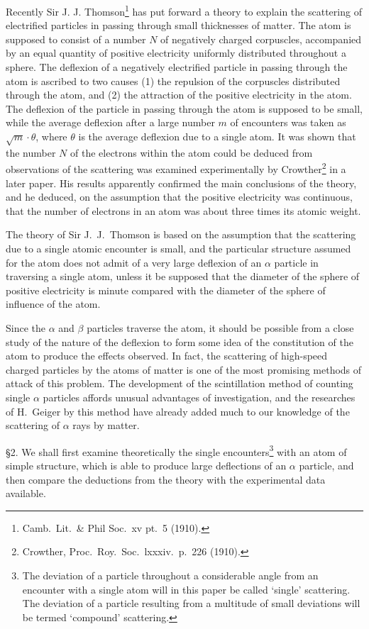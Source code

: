 \documentclass[12pt]{article}
\begin{document}
\bigskip
Recently Sir J. J. Thomson\footnote{Camb.~Lit.~\& Phil Soc.~xv pt.~5 (1910).}
has put forward a theory to
explain the scattering of electrified particles in passing through small thicknesses of matter.
The atom is supposed to consist of a number $N$ of negatively charged corpuscles, accompanied
by an equal quantity of positive electricity uniformly distributed throughout a sphere.
The deflexion of a negatively electrified particle in passing through the atom is ascribed to two causes
(1) the repulsion of the corpuscles distributed through the atom,
and (2) the attraction of the positive electricity in the atom.
The deflexion of the particle in passing through the atom is supposed to be small,
while the average deflexion after a large number $m$ of encounters was taken as $\sqrt m\cdot\theta$,
where $\theta$ is the average deflexion due to a single atom. It was shown that the number $N$ of the electrons within the atom could be deduced from observations of the scattering was examined experimentally by
Crowther\footnote{Crowther, Proc.~Roy.~Soc.~lxxxiv.~p.~226 (1910).}
in a later paper.
His results apparently confirmed the main conclusions of the theory, and he deduced, on the assumption that the positive electricity was continuous, that the number of electrons in an atom was about three times its atomic weight.

\bigskip
The theory of Sir J.~J.~Thomson is based on the assumption that the scattering due to a single atomic encounter is small,
and the particular structure assumed for the atom does not admit of a very large deflexion of an
$\alpha$ particle in traversing a single atom, unless it be supposed that the diameter of the sphere of positive
electricity is minute compared with the diameter of the sphere of influence of the atom.

\bigskip
Since the $\alpha$ and $\beta$ particles traverse the atom, it should be possible from a close study of the nature
of the deflexion to form some idea of the constitution of the atom to produce the effects observed. In fact,
the scattering of high-speed charged particles by the atoms of matter is one of the most promising methods of attack
of this problem.
The development of the scintillation method of counting single $\alpha$ particles affords unusual advantages of
investigation, and the researches of H.~Geiger by this method have already added much to our knowledge of the
scattering of $\alpha$ rays by matter.

\bigskip
\S 2.
We shall first examine theoretically the single encounters\footnote{The deviation of a particle throughout a considerable angle from an encounter with a single atom will in this paper be called `single' scattering. The deviation of a particle resulting from a multitude of small deviations will be termed `compound' scattering.}
with an atom of simple structure, which is able to
produce large deflections of an $\alpha$ particle, and then compare the deductions from the theory with the
experimental data available.
\end{document}

